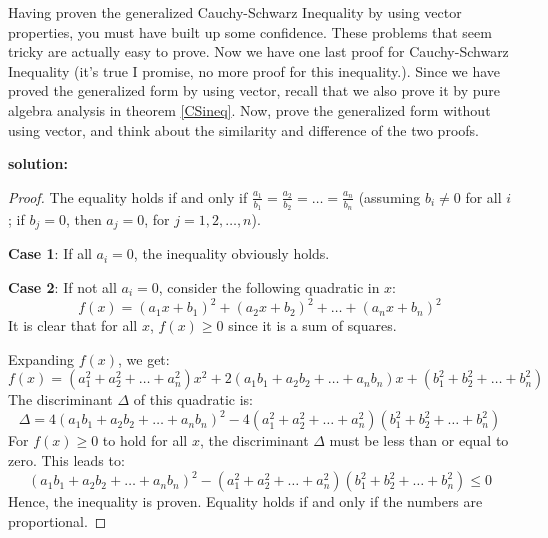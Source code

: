 \begin{exercise}
    Having proven the generalized Cauchy-Schwarz Inequality by using vector properties, you must have
    built up some confidence. These problems that seem tricky are actually easy to prove. Now we have 
    one last proof for  Cauchy-Schwarz Inequality (it's true I promise, no more proof for this inequality.).
    Since we have proved the generalized form by using vector, recall that we also prove it by pure algebra
    analysis in theorem \ref{CSineq}. Now, prove the generalized form without using vector, and think
    about the similarity and difference of the two proofs.
\end{exercise}
\textbf{solution:}
\begin{proof}
    The equality holds if and only if \( \frac{a_1}{b_1} = \frac{a_2}{b_2} = \ldots = \frac{a_n}{b_n} \) (assuming \( b_i \neq 0 \) for all \( i \); if \( b_j = 0 \), then \( a_j = 0 \), for \( j = 1, 2, \ldots, n \)).
    
    \textbf{Case 1}: If all \( a_i = 0 \), the inequality obviously holds.
    
    \textbf{Case 2}: If not all \( a_i = 0 \), consider the following quadratic in \( x \):
    \[
    f(x) = (a_1x + b_1)^2 + (a_2x + b_2)^2 + \ldots + (a_nx + b_n)^2
    \]
    It is clear that for all \( x \), \( f(x) \geq 0 \) since it is a sum of squares.
    
    Expanding \( f(x) \), we get:
    \[
    f(x) = (a_1^2 + a_2^2 + \ldots + a_n^2)x^2 + 2(a_1b_1 + a_2b_2 + \ldots + a_nb_n)x + (b_1^2 + b_2^2 + \ldots + b_n^2)
    \]
    The discriminant \( \Delta \) of this quadratic is:
    \[
    \Delta = 4(a_1b_1 + a_2b_2 + \ldots + a_nb_n)^2 - 4(a_1^2 + a_2^2 + \ldots + a_n^2)(b_1^2 + b_2^2 + \ldots + b_n^2)
    \]
    For \( f(x) \geq 0 \) to hold for all \( x \), the discriminant \( \Delta \) must be less than or equal to zero. This leads to:
    \[
    (a_1b_1 + a_2b_2 + \ldots + a_nb_n)^2 - (a_1^2 + a_2^2 + \ldots + a_n^2)(b_1^2 + b_2^2 + \ldots + b_n^2) \leq 0
    \]
    Hence, the inequality is proven. Equality holds if and only if the numbers are proportional.
    \end{proof}


